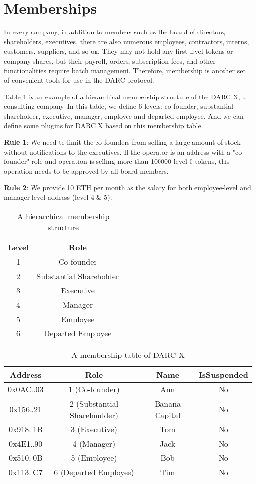 \documentclass[main.tex]{subfiles}
\begin{document}
\section{Memberships}

In every company, in addition to members such as the board of directors, shareholders, executives, there are also numerous employees, contractors, interns, customers, suppliers, and so on. They may not hold any first-level tokens or company shares, but their payroll, orders, subscription fees, and other functionalities require batch management. Therefore, membership is another set of convenient tools for use in the DARC protocol.



Table \ref{table:1} is an example of a hierarchical membership structure of the DARC X, a consulting company. In this table, we define 6 levels: co-founder, substantial shareholder, executive, manager, employee and departed employee. And we can define some plugins for DARC X based on this membership table.

\textbf{Rule 1}: We need to limit the co-founders from selling a large amount of stock without notifications to the executives. If the operator is an address with a "co-founder" role and operation is selling more than 100000 level-0 tokens, this operation needs to be approved by all board members.

\textbf{Rule 2}: We provide 10 ETH per month as the salary for both employee-level and manager-level address (level 4 \& 5).

\begin{table}[h!]
\centering
\begin{tabular}{||c c||} 
 \hline
 Level & Role \\ [0.5ex] 
 \hline\hline
 1 & Co-founder \\ 
 2 & Substantial Shareholder \\
 3 & Executive \\
 4 & Manager \\
 5 & Employee \\
 6 & Departed Employee \\ [1ex] 
 \hline
\end{tabular}
\caption{A hierarchical membership structure}
\label{table:1}
\end{table}

\begin{table}[h!]
\centering
\begin{tabular}{||c c c c||} 
 \hline
 Address & Role & Name & IsSuspended \\ [0.5ex] 
 \hline\hline
 0x0AC..03 & 1 (Co-founder) & Ann & No \\
 0x156..21 & 2 (Substantial Sharehoulder) & Banana Capital & No \\
 0x918..1B & 3 (Executive) & Tom & No \\
 0x4E1..90 & 4 (Manager) & Jack & No \\
 0x510..0B & 5 (Employee) & Bob & No \\
 0x113..C7 & 6 (Departed Employee) & Tim & No \\ [1ex] 
 \hline
\end{tabular}
\caption{A membership table of DARC X}
\label{table:2}
\end{table}
\end{document}
